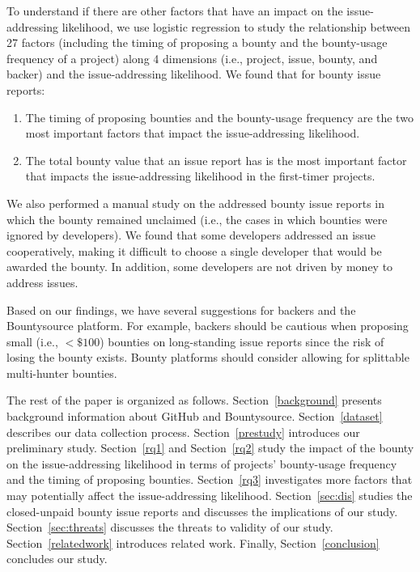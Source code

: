 To understand if there are other factors that have an impact on the issue-addressing likelihood, we use logistic regression to study the relationship between 27 factors (including the timing of proposing a bounty and the bounty-usage frequency of a project) along 4 dimensions (i.e., project, issue, bounty, and backer) and the issue-addressing likelihood. We found that for bounty issue reports:
\begin{enumerate}
\item The timing of proposing bounties and the bounty-usage frequency are the two most important factors that impact the issue-addressing likelihood.
\item The total bounty value that an issue report has is the most important factor that impacts the issue-addressing likelihood in the first-timer projects.
\end{enumerate}


We also performed a manual study on the addressed bounty issue reports in which the bounty remained unclaimed (i.e., the cases in which bounties were ignored by developers). We found that some developers addressed an issue cooperatively, making it difficult to choose a single developer that would be awarded the bounty. In addition, some developers are not driven by money to address issues.

Based on our findings, we have several suggestions for backers and the Bountysource platform. For example, backers should be cautious when proposing small (i.e., $< \$100$) bounties on long-standing issue reports since the risk of losing the bounty exists. Bounty platforms should consider allowing for splittable multi-hunter bounties.





The rest of the paper is organized as follows.
Section~\ref{background} presents background information about GitHub and Bountysource.
Section~\ref{dataset} describes our data collection process.
Section~\ref{prestudy} introduces our preliminary study.
Section~\ref{rq1} and Section~\ref{rq2} study the impact of the bounty on the issue-addressing likelihood in terms of projects' bounty-usage frequency and the timing of proposing bounties.
Section~\ref{rq3} investigates more factors that may potentially affect the issue-addressing likelihood.
 Section~\ref{sec:dis} studies the closed-unpaid bounty issue reports and discusses the implications of our study. Section~\ref{sec:threats} discusses the threats to validity of our study. Section~\ref{relatedwork} introduces related work. Finally, Section~\ref{conclusion} concludes our study.
